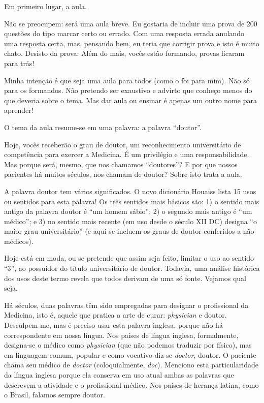 \documentclass[pdftex, brazil, 12pt, oneside]{article}
\newcommand{\ingles}[1]{\textit{#1}}
\begin{document}
Em primeiro lugar, a aula.

Não se preocupem: será uma aula breve. Eu gostaria de incluir uma prova de 200 questões
do tipo marcar certo ou errado. Com uma resposta errada anulando uma resposta certa, mas,
pensando bem, eu teria que corrigir prova e isto é muito chato. Desisto da prova.
Além do mais, vocês estão formando, provas ficaram para trás!

Minha intenção é que seja uma aula para todos (como o foi para mim). Não só para os formandos.
Não pretendo ser exaustivo e advirto que conheço menos do que deveria sobre o tema.
Mas dar aula ou ensinar é apenas um outro nome para aprender!

O tema da aula resume-se em uma palavra: a palavra ``doutor''.

Hoje, vocês receberão o grau de doutor, um reconhecimento universitário de competência
para exercer a Medicina. É um privilégio e uma responsabilidade. Mas porque será, mesmo,
que nos chamamos ``doutores''? E por que nossos pacientes há muitos séculos, nos chamam
de doutor? Sobre isto trata a aula.

A palavra doutor tem vários significados. O novo dicionário Houaiss lista 15 usos ou
sentidos para esta palavra! Os três sentidos mais básicos são: 1) o sentido mais antigo
da palavra doutor é ``um homem sábio''; 2) o segundo mais antigo é ``um médico''; e
3) no sentido mais recente (em uso desde o século XII DC) designa ``o maior grau universitário''
(e aqui se incluem os graus de doutor conferidos a não médicos).

Hoje está em moda, ou se pretende que assim seja feito, limitar o uso ao sentido ``3'',
ao possuidor do título universitário de doutor. Todavia, uma análise histórica dos usos
deste termo revela que todos derivam de uma só fonte. Vejamos qual seja.

Há séculos, duas palavras têm sido empregadas para designar o profissional da Medicina, isto é,
aquele que pratica a arte de curar: \ingles{physician} e doutor. Desculpem-me, mas é preciso usar
esta palavra inglesa, porque não há correspondente em nossa língua. Nos países de língua inglesa,
formalmente, designa-se o médico como \ingles{physician} (que não podemos traduzir por físico),
mas em linguagem comum, popular e como vocativo diz-se \ingles{doctor}, doutor. O paciente chama
seu médico de \ingles{doctor} (coloquialmente, \ingles{doc}). Menciono esta particularidade da
língua inglesa porque ela conserva em uso atual ambas as palavras que descrevem a atividade e o
profissional médico. Nos países de herança latina, como o Brasil, falamos sempre doutor.
\end{document}
